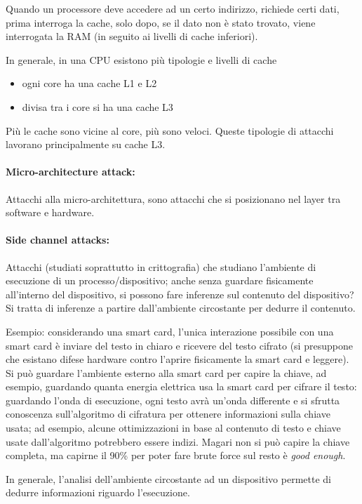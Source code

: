 Quando un processore deve accedere ad un certo indirizzo, richiede certi dati, prima interroga la cache, solo dopo, se il dato non è stato trovato, viene interrogata la RAM (in seguito ai livelli di cache inferiori).

In generale, in una CPU esistono più tipologie e livelli di cache 
\begin{itemize}
	\item ogni core ha una cache L1 e L2
	
    \item divisa tra i core si ha una cache L3
\end{itemize}
Più le cache sono vicine al core, più sono veloci. Queste tipologie di attacchi lavorano principalmente su cache L3. 

\paragraph{Micro-architecture attack:} Attacchi alla micro-architettura, sono attacchi che si posizionano nel layer tra software e hardware.

\paragraph{Side channel attacks:} Attacchi (studiati soprattutto in crittografia) che studiano l'ambiente di esecuzione di un processo/dispositivo; anche senza guardare fisicamente all'interno del dispositivo, si possono fare inferenze sul contenuto del dispositivo? Si tratta di inferenze a partire dall'ambiente circostante per dedurre il contenuto.

Esempio: considerando una smart card, l'unica interazione possibile con una smart card è inviare del testo in chiaro e ricevere del testo cifrato (si presuppone che esistano difese hardware contro l'aprire fisicamente la smart card e leggere). Si può guardare l'ambiente esterno alla smart card per capire la chiave, ad esempio, guardando quanta energia elettrica usa la smart card per cifrare il testo: guardando l'onda di esecuzione, ogni testo avrà un'onda differente e si sfrutta conoscenza sull'algoritmo di cifratura per ottenere informazioni sulla chiave usata; ad esempio, alcune ottimizzazioni in base al contenuto di testo e chiave usate dall'algoritmo potrebbero essere indizi. Magari non si può capire la chiave completa, ma capirne il 90\% per poter fare brute force sul resto è \textit{good enough}.

In generale, l'analisi dell'ambiente circostante ad un dispositivo permette di dedurre informazioni riguardo l'esecuzione.

